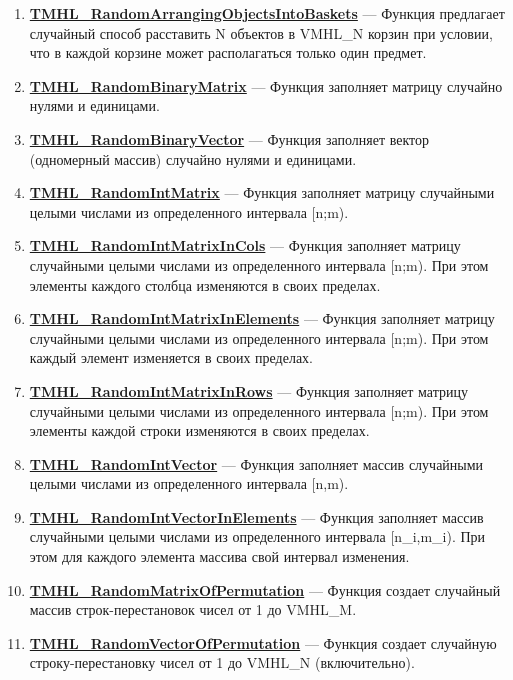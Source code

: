 \documentclass[a4paper,12pt]{article}
\begin{document}
\begin{enumerate}
\item \textbf{\hyperref[TMHL_RandomArrangingObjectsIntoBaskets]{TMHL\_RandomArrangingObjectsIntoBaskets}} --- Функция предлагает случайный способ расставить N объектов в VMHL\_N корзин при условии, что в каждой корзине может располагаться только один предмет.

\item \textbf{\hyperref[TMHL_RandomBinaryMatrix]{TMHL\_RandomBinaryMatrix}} --- Функция заполняет матрицу случайно нулями и единицами.

\item \textbf{\hyperref[TMHL_RandomBinaryVector]{TMHL\_RandomBinaryVector}} --- Функция заполняет вектор (одномерный массив) случайно нулями и единицами.

\item \textbf{\hyperref[TMHL_RandomIntMatrix]{TMHL\_RandomIntMatrix}} --- Функция заполняет матрицу случайными целыми числами из определенного интервала [n;m).

\item \textbf{\hyperref[TMHL_RandomIntMatrixInCols]{TMHL\_RandomIntMatrixInCols}} --- Функция заполняет матрицу случайными целыми числами из определенного интервала [n;m). При этом элементы каждого столбца изменяются в своих пределах.

\item \textbf{\hyperref[TMHL_RandomIntMatrixInElements]{TMHL\_RandomIntMatrixInElements}} --- Функция заполняет матрицу случайными целыми числами из определенного интервала [n;m). При этом каждый элемент изменяется в своих пределах.

\item \textbf{\hyperref[TMHL_RandomIntMatrixInRows]{TMHL\_RandomIntMatrixInRows}} --- Функция заполняет матрицу случайными целыми числами из определенного интервала [n;m). При этом элементы каждой строки изменяются в своих пределах.

\item \textbf{\hyperref[TMHL_RandomIntVector]{TMHL\_RandomIntVector}} --- Функция заполняет массив случайными целыми числами из определенного интервала [n,m).

\item \textbf{\hyperref[TMHL_RandomIntVectorInElements]{TMHL\_RandomIntVectorInElements}} --- Функция заполняет массив случайными целыми  числами из определенного интервала [n\_i,m\_i). При этом для каждого элемента массива свой интервал изменения.

\item \textbf{\hyperref[TMHL_RandomMatrixOfPermutation]{TMHL\_RandomMatrixOfPermutation}} --- Функция создает случайный массив строк-перестановок чисел от 1 до VMHL\_M.

\item \textbf{\hyperref[TMHL_RandomVectorOfPermutation]{TMHL\_RandomVectorOfPermutation}} --- Функция создает случайную строку-перестановку чисел от 1 до VMHL\_N (включительно).

\end{enumerate}
\end{document}
